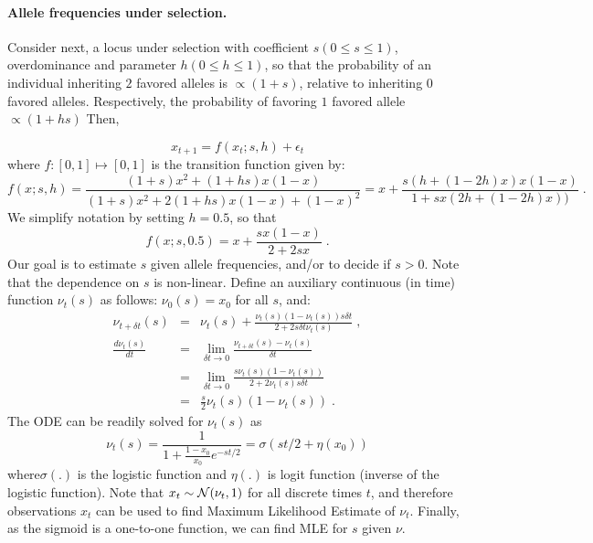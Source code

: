 \documentclass[11pt]{article}
\begin{document}
\paragraph{Allele frequencies under selection.}
Consider next, a locus under selection with coefficient $s (0\le s\le
1)$, overdominance and parameter $h (0\le h\le 1)$, so that the
probability of an individual inheriting $2$ favored alleles is
$\propto (1+s)$, relative to inheriting $0$ favored
alleles. Respectively, the probability of favoring $1$ favored allele
$\propto (1+hs)$ Then,


\begin{equation}
	x_{t+1} = f(x_t;s,h) + \epsilon_t
	\label{eq:trans0} 
\end{equation}
where $f: [0,1] \mapsto [0,1]$ is the
transition function given by:
\begin{equation}
	f(x;s,h)=\frac{(1+s)x^2 + (1+hs)x(1-x)}{(1+s)x^2 + 2(1+hs)x(1-x) + (1-x)^2}
	=x+\frac{s(h+(1-2h)x)x(1-x)}{1+sx(2h+(1-2h)x))}\;.
\end{equation}
We simplify notation by setting $h=0.5$, so that
\begin{equation}
	f(x;s,0.5)=x+\frac{sx(1-x)}{2+2sx}\;.
	\label{eq:hequalshalf}
\end{equation}
Our goal is to estimate $s$ given allele frequencies, and/or to decide
if $s>0$. Note that the dependence on $s$ is non-linear. Define an
auxiliary continuous (in time) function $\nu_t(s)$ as follows:
$\nu_0(s)=x_0$ for all $s$, and:
\begin{eqnarray}
	\nu_{t+\delta t}(s) &=& \nu_t(s)+\frac{\nu_t(s)(1-\nu_t(s))s\delta 
	t}{2+2s\delta t \nu_t(s)}\;,\\
	\frac{d\nu_t(s)}{dt} &=&\lim_{\delta t\rightarrow 0}\frac{\nu_{t+\delta t}(s) 
	-\nu_t(s)}{\delta t}\\
	&=&\lim_{\delta t\rightarrow 
	0}\frac{s\nu_t(s)(1-\nu_t(s))}{2+2\nu_t(s)s\delta t}\\
	&=& \frac{s}{2}\nu_t(s)(1-\nu_t(s)) \;.
	\label{eq:ode}
\end{eqnarray}
The ODE can be readily solved for $\nu_t(s)$ as
\begin{equation}
	\nu_t(s) =\frac{1}{1+\frac{1-x_0}{x_0}e^{-st/2}} = \sigma(st/2+\eta(x_0)) 
	\label{eq:inf-pop}
\end{equation}
where$\sigma(.)$ is the logistic
function and $\eta(.)$ is logit function (inverse of the logistic function). Note 
that $x_t\sim{\cal N}(\nu_t,1)$ for all discrete times $t$,
and therefore observations $x_t$ can be used to find Maximum
Likelihood Estimate of $\nu_t$. Finally, as the sigmoid is a
one-to-one function, we can find MLE for $s$ given {\bf $\nu$}.
\end{document}
